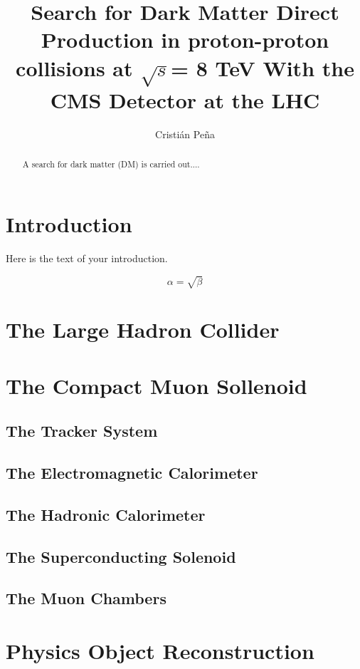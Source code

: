\documentclass[draftfoot,preprint]{cit_thesis}
\begin{document}
\title{Search for Dark Matter Direct Production in proton-proton collisions at $\sqrt{s} $= 8 TeV With the CMS Detector at the LHC}
\author{Cristi\'an Pe\~na}

\maketitle

\begin{abstract}
A search for dark matter (DM) is carried out....
\end{abstract}

\section{Introduction}
Here is the text of your introduction.

\begin{equation}
    \label{simple_equation}
    \alpha = \sqrt{ \beta }
\end{equation}

\section{The Large Hadron Collider}
\section{The Compact Muon Sollenoid}
\subsection{The Tracker System}
\subsection{The Electromagnetic Calorimeter}
\subsection{The Hadronic Calorimeter}
\subsection{The Superconducting Solenoid}
\subsection{The Muon Chambers}
\section{Physics Object Reconstruction}
\end{document}
